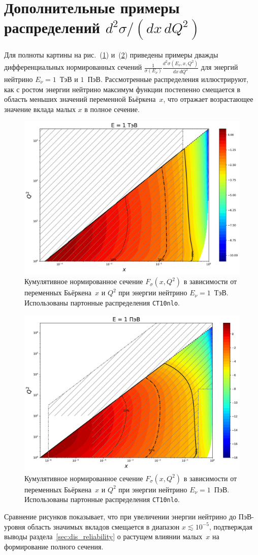 \section{Дополнительные примеры распределений $d^2\sigma/(dx\,dQ^2)$}
\label{sec:examples_extrapolated_region}

Для полноты картины на рис.~(\ref{Pp3}) и~(\ref{Pp6}) приведены примеры дважды дифференциальных нормированных сечений $\frac{1}{\sigma(E_\nu)}\frac{d^2\sigma(E_\nu,x,Q^2)}{dx\,dQ^2}$ для энергий нейтрино $E_\nu = 1$~ТэВ и $1$~ПэВ. 
Рассмотренные распределения иллюстрируют, как с ростом энергии нейтрино максимум функции постепенно смещается в область меньших значений переменной Бьёркена~$x$, что отражает возрастающее значение вклада малых $x$ в полное сечение. 

\begin{figure}[!h]
\centering
\includegraphics[width=0.8\linewidth]{images/NuProp/cdfxq2_cc_proton_CT18ZNNLO_14_1000.pdf}
\caption{Кумулятивное нормированное сечение $F_{\sigma}(x,Q^2)$ в зависимости от переменных Бьёркена~$x$ и $Q^2$ при энергии нейтрино $E_{\nu} = 1$~ТэВ. Использованы партонные распределения \texttt{CT10nlo}.}
\label{Pp3}
\end{figure}

\begin{figure}[!h]
\centering
\includegraphics[width=0.8\linewidth]{images/NuProp/cdfxq2_cc_proton_CT18ZNNLO_14_1000000.pdf}
\caption{Кумулятивное нормированное сечение $F_{\sigma}(x,Q^2)$ в зависимости от переменных Бьёркена~$x$ и $Q^2$ при энергии нейтрино $E_{\nu} = 1$~ПэВ. Использованы партонные распределения \texttt{CT10nlo}.}
\label{Pp6}
\end{figure}

Сравнение рисунков показывает, что при увеличении энергии нейтрино до ПэВ-уровня область значимых вкладов смещается в диапазон $x \lesssim 10^{-5}$, подтверждая выводы раздела~\ref{sec:dis_reliability} о растущем влиянии малых~$x$ на формирование полного сечения.
